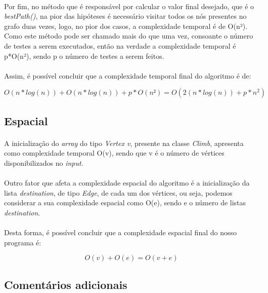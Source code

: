 \documentclass[12pt]{article}
\begin{document}
\paragraph{}
Por fim, no método que é responsável por calcular o valor final desejado, que é o \textit{bestPath()}, na pior das hipóteses é necessário visitar todos os nós presentes no grafo duas vezes, logo, no pior dos casos, a complexidade temporal é de O(n²). Como este método pode ser chamado mais do que uma vez, consoante o número de testes a serem executados, então na verdade a complexidade temporal é p*O(n²), sendo p o número de testes a serem feitos.
\paragraph{}
Assim, é possível concluir que a complexidade temporal final do algoritmo é de:

\begin{equation*}
O(n*log(n)) + O(n*log(n)) + p*O(n²) = O(2(n*log(n)) + p*n^{2})
\end{equation*}

\subsection{Espacial}
\paragraph{}
A inicialização do \textit{array} do tipo \textit{Vertex v}, presente na classe \textit{Climb}, apresenta como complexidade temporal O(v), sendo que v é o número de vértices disponibilizados no \textit{input}.
\paragraph{}
Outro fator que afeta a complexidade espacial do algoritmo é a inicialização da lista \textit{destination}, de tipo \textit{Edge}, de cada um dos vértices, ou seja, podemos considerar a sua complexidade espacial como O(e), sendo e o número de listas \textit{destination}.
\paragraph{}
Desta forma, é possível concluir que a complexidade espacial final do nosso programa é:

\begin{equation*}
O(v) + O(e) = O(v + e)
\end{equation*}  
\newpage
\begin{center}
\section{Comentários adicionais}
\end{center}
\end{document}
